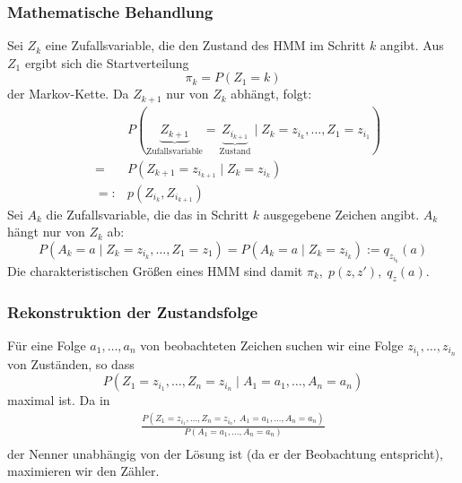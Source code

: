 \subsubsection{Mathematische Behandlung}
Sei \(Z_k\) eine Zufallsvariable, die den Zustand des HMM im Schritt \(k\) angibt.
Aus \(Z_1\) ergibt sich die Startverteilung \[\pi_k=P(Z_1=k)\] der Markov-Kette.
Da \(Z_{k+1}\) nur von \(Z_k\) abhängt, folgt:
\begin{eqnarray*}
	&&P(\underbrace{Z_{k+1}}_{\text{Zufallsvariable}}=\underbrace{Z_{i_{k+1}}}_{\text{Zustand}}
    \mid Z_k =z_{i_k}, \ldots, Z_1=z_{i_1})\\
	&=& P(Z_{k+1} = z_{i_{k+1}}\mid Z_k=z_{i_k})\\
	&=:& p(Z_{i_k},Z_{i_{k+1}})
\end{eqnarray*}
Sei \(A_k\) die Zufallsvariable, die das in Schritt \(k\) ausgegebene Zeichen angibt.
\(A_k\) hängt nur von \(Z_k\) ab:
\[P(A_k=a\mid Z_k=z_{i_k}, \ldots, Z_1=z_1) = P(A_k=a\mid Z_k=z_{i_k}) := q_{z_{i_k}}(a)\]
Die charakteristischen Größen eines HMM sind damit \(\pi_k,\; p(z,z'),\; q_z(a)\).

\subsubsection{Rekonstruktion der Zustandsfolge}
Für eine Folge \(a_1,\dots,a_n\) von beobachteten Zeichen suchen wir eine Folge \(z_{i_1}, \ldots, z_{i_n}\) von Zuständen, so dass
\[P(Z_1=z_{i_1}, \ldots, Z_n=z_{i_n} \mid  A_1=a_1, \ldots, A_n=a_n)\]
maximal ist.
Da in
\begin{eqnarray*}
    \frac{P(Z_1=z_{i_1}, \dots, Z_n=z_{i_n},\; A_1 = a_1, \dots, A_n=a_n)}{P(A_1=a_1, \dots, A_n=a_n)} \\
\end{eqnarray*}
der Nenner unabhängig von der Lösung ist (da er der Beobachtung entspricht), maximieren wir den Zähler.

